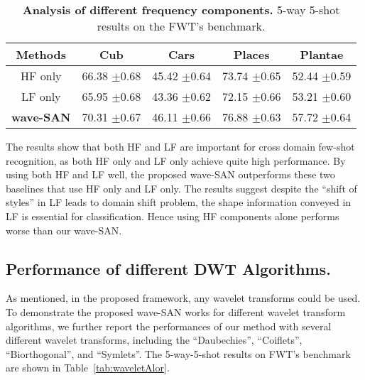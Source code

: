 \documentclass{article}
\newcommand{\mypm}{\scriptsize$\pm$}
\begin{document}
\begin{table}[h] \small
\begin{center}
\begin{tabular} { c c c c c}
	\hline
	\textbf{Methods} & \textbf{Cub} & \textbf{Cars} & \textbf{Places} & \textbf{Plantae} \\
	\hline
	HF only    & 66.38 \mypm 0.68 & 45.42 \mypm 0.64
& 73.74 \mypm 0.65 & 52.44 \mypm 0.59 \\
	\hline
	LF only & 65.95 \mypm 0.68 & 43.36 \mypm 0.62 &  72.15 \mypm 0.66 & 53.21 \mypm 0.60 \\
	\hline
	\textbf{wave-SAN}  & 70.31 \mypm 0.67 & 46.11 \mypm 0.66 & 76.88 \mypm 0.63 & 57.72 \mypm 0.64 \\
	\hline
	\end{tabular}
	\end{center}
\caption{\textbf{Analysis of different frequency components.} 5-way 5-shot results on the FWT's benchmark.}
\label{tab:component}
\end{table}

The results show that both HF and LF are important for cross domain few-shot recognition, as both HF only and LF only achieve quite high performance. By using both HF and LF well, the proposed wave-SAN outperforms these two baselines that use HF only and LF only. The results suggest despite the ``shift of styles'' in LF leads to domain shift problem, the shape information conveyed in LF is essential for classification. Hence using HF components alone performs worse than our wave-SAN. 





\subsection{Performance of different DWT Algorithms.}
As mentioned, in the proposed framework, any wavelet transforms could be used. To demonstrate the proposed wave-SAN works for different wavelet transform algorithms, we further report the performances of our method with several different wavelet transforms, including the ``Daubechies'', ``Coiflets'', ``Biorthogonal'', and ``Symlets''. The 5-way-5-shot results on FWT's benchmark are shown in Table~\ref{tab:waveletAlor}.
\end{document}
